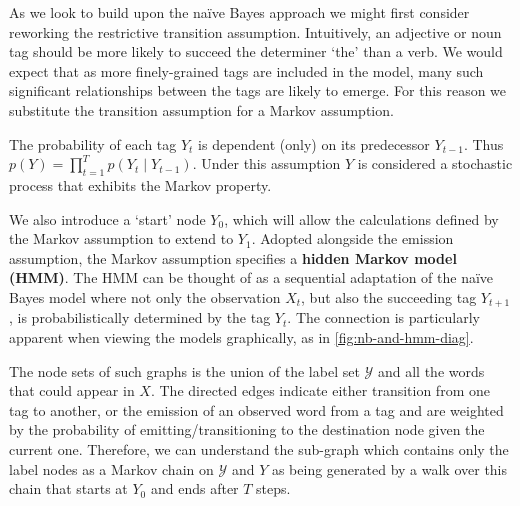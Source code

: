\documentclass[../main.tex]{subfiles}
\begin{document}
As we look to build upon the na{\"i}ve Bayes approach we might first consider reworking the restrictive transition assumption.
Intuitively, an adjective or noun tag should be more likely to succeed the determiner `the' than a verb.
We would expect that as more finely-grained tags are included in the model, many such significant relationships between the tags are likely to emerge.
For this reason we substitute the transition assumption for a Markov assumption.

\begin{assumption} \label{ass:markov-assumption}
    The probability of each tag $Y_t$ is dependent (only) on its predecessor $Y_{t-1}$. Thus $p(Y) = \prod_{t=1}^T p(Y_t \mid Y_{t-1})$. Under this assumption $Y$ is considered a stochastic process that exhibits the Markov property.
\end{assumption}

We also introduce a `start' node $Y_0$, which will allow the calculations defined by the Markov assumption to extend to $Y_1$.
Adopted alongside the emission assumption, the Markov assumption specifies a \textbf{hidden Markov model (HMM)}.
The HMM can be thought of as a sequential adaptation of the na{\"i}ve Bayes model where not only the observation $X_t$, but also the succeeding tag $Y_{t+1}$, is probabilistically determined by the tag $Y_t$.
The connection is particularly apparent when viewing the models graphically, as in \cref{fig:nb-and-hmm-diag}.



The node sets of such graphs is the union of the label set $\mathcal{Y}$ and all the words that could appear in $X$.
The directed edges indicate either transition from one tag to another, or the emission of an observed word from a tag and are weighted by the probability of emitting/transitioning to the destination node given the current one.
Therefore, we can understand the sub-graph which contains only the label nodes as a Markov chain on $\mathcal{Y}$ and $Y$ as being generated by a walk over this chain that starts at $Y_0$ and ends after $T$ steps.
\end{document}
